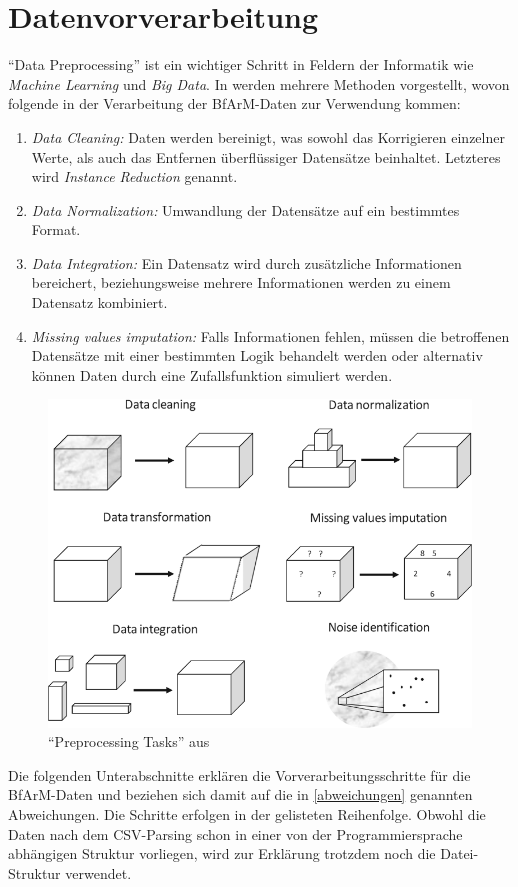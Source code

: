 \section{Datenvorverarbeitung}

``Data Preprocessing'' ist ein wichtiger Schritt in Feldern der Informatik wie \emph{Machine Learning} und \emph{Big Data}. In \citep{garcia2016big} werden mehrere Methoden vorgestellt, wovon folgende in der Verarbeitung der BfArM-Daten zur Verwendung kommen:

\begin{enumerate}
\item \emph{Data Cleaning:} Daten werden bereinigt, was sowohl das Korrigieren einzelner Werte, als auch das Entfernen überflüssiger Datensätze beinhaltet. Letzteres wird \emph{Instance Reduction} genannt. 
\item \emph{Data Normalization:} Umwandlung der Datensätze auf ein bestimmtes Format. 
\item \emph{Data Integration:} Ein Datensatz wird durch zusätzliche Informationen bereichert, beziehungsweise mehrere Informationen werden zu einem Datensatz kombiniert. 
\item \emph{Missing values imputation:} Falls Informationen fehlen, müssen die betroffenen Datensätze mit einer bestimmten Logik behandelt werden oder alternativ können Daten durch eine Zufallsfunktion simuliert werden. 
\end{enumerate}

\begin{figure}[H]
    \centering
    \includegraphics[width=.7\linewidth]{../img/data_preproc.png}
    \caption{``Preprocessing Tasks'' aus \citep[Seite 4]{garcia2016big}}
\end{figure}

Die folgenden Unterabschnitte erklären die Vorverarbeitungsschritte für die BfArM-Daten und beziehen sich damit auf die in \ref{abweichungen} genannten Abweichungen. Die Schritte erfolgen in der gelisteten Reihenfolge. Obwohl die Daten nach dem CSV-Parsing schon in einer von der Programmiersprache abhängigen Struktur vorliegen, wird zur Erklärung trotzdem noch die Datei-Struktur verwendet.


